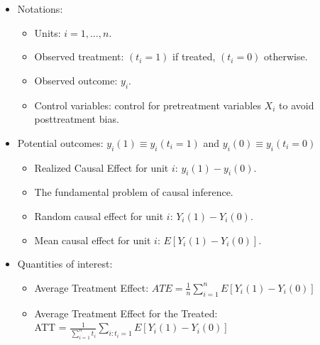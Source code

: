 \documentclass[20pt,landscape,pdftex]{foils}
\begin{document}


\hypersetup{pdfpagetransition=Replace}

\begin{itemize}

\item Notations:\pause
  \begin{itemize}
  \item Units:  $i=1,\dots,n$.\pause
  \item Observed treatment: $(t_i=1)$ if treated, $(t_i=0)$ otherwise.\pause
  \item Observed outcome: $y_i$.\pause
  \item Control variables: control for pretreatment variables $X_i$ to
    avoid posttreatment bias.\pause
  \end{itemize}

\item Potential outcomes: $y_i(1) \equiv y_i(t_i=1)$ and $y_i(0)
  \equiv y_i(t_i=0)$\pause  
  \begin{itemize}
  \item Realized Causal Effect for unit $i$: $y_i(1) - y_i(0)$.\pause
  \item The fundamental problem of causal inference.\pause
  \item Random causal effect for unit $i$: $Y_i(1) - Y_i(0).$\pause
  \item Mean causal effect for unit $i$: $E[Y_i(1) - Y_i(0)].$\pause
  \end{itemize}

\item Quantities of interest:\pause
  \begin{itemize}
    \item Average Treatment Effect: $ATE = \frac{1}{n}\sum_{i=1}^n
      E[Y_i(1) - Y_i(0)]$\pause 
      \bigskip
    \item Average Treatment Effect for the Treated:\\ ATT =
      $\frac{1}{\sum_{i=1}^n t_i}\sum_{i:t_i=1} E[Y_i(1) -
      Y_i(0)]$\pause 
  \end{itemize}
\end{itemize}


\end{document}
